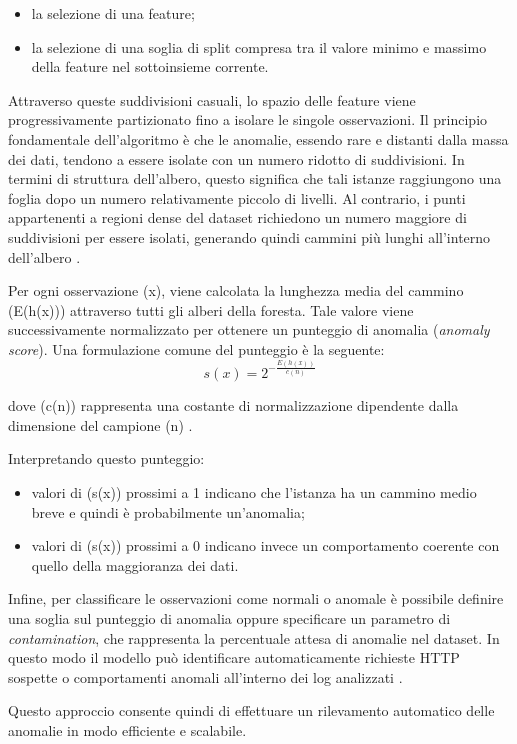 \begin{itemize}
    \item la selezione di una feature;
    \item la selezione di una soglia di split compresa tra il valore minimo e massimo della feature nel sottoinsieme corrente.
\end{itemize}
Attraverso queste suddivisioni casuali, lo spazio delle feature viene progressivamente partizionato fino a isolare le singole osservazioni.
Il principio fondamentale dell’algoritmo è che le anomalie, essendo rare e distanti dalla massa dei dati, tendono a essere isolate con un numero ridotto di suddivisioni. In termini di struttura dell’albero, questo significa che tali istanze raggiungono una foglia dopo un numero relativamente piccolo di livelli. Al contrario, i punti appartenenti a regioni dense del dataset richiedono un numero maggiore di suddivisioni per essere isolati, generando quindi cammini più lunghi all’interno dell’albero \parencite{liu2008isolation}.

Per ogni osservazione (x), viene calcolata la lunghezza media del cammino (E(h(x))) attraverso tutti gli alberi della foresta. Tale valore viene successivamente normalizzato per ottenere un punteggio di anomalia (\emph{anomaly score}). Una formulazione comune del punteggio è la seguente:
\begin{equation}
    s(x) = 2^{-\frac{E(h(x))}{c(n)}}
    \label{eq:anomaly_score}
\end{equation}

dove (c(n)) rappresenta una costante di normalizzazione dipendente dalla dimensione del campione (n) \parencite{liu2008isolation}.

Interpretando questo punteggio:
\begin{itemize}
    \item valori di (s(x)) prossimi a 1 indicano che l’istanza ha un cammino medio breve e quindi è probabilmente un’anomalia;
    \item valori di (s(x)) prossimi a 0 indicano invece un comportamento coerente con quello della maggioranza dei dati.
\end{itemize}

Infine, per classificare le osservazioni come normali o anomale è possibile definire una soglia sul punteggio di anomalia oppure specificare un parametro di \emph{contamination}, che rappresenta la percentuale attesa di anomalie nel dataset. In questo modo il modello può identificare automaticamente richieste HTTP sospette o comportamenti anomali all’interno dei log analizzati \parencite{scikit-learn}.

Questo approccio consente quindi di effettuare un rilevamento automatico delle anomalie in modo efficiente e scalabile.